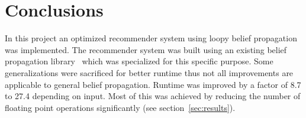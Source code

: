 \section{Conclusions}

In this project an optimized recommender system using loopy belief propagation was implemented. The recommender system was built using an existing belief propagation library~\cite{Mooij_libDAI_10} which was specialized for this specific purpose. Some generalizations were sacrificed for better runtime thus not all improvements are applicable to general belief propagation. Runtime was improved by a factor of 8.7 to 27.4 depending on input. Most of this was achieved by reducing the number of floating point operations significantly (see section~\ref{sec:results}).
